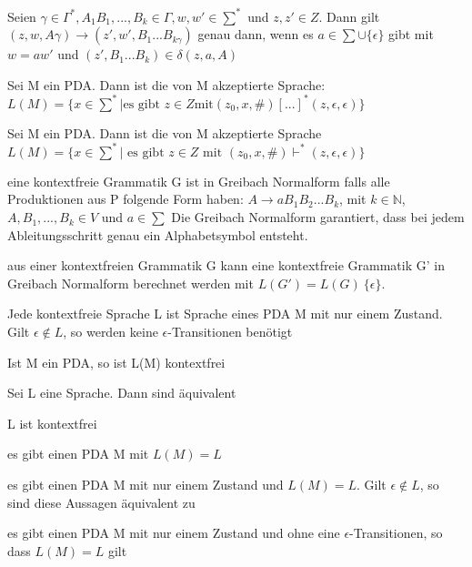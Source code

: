 \documentclass[avery5371, frame]{flashcards}
\begin{document}
\begin{flashcard}[Definition]{ Seien $\gamma\in\Gamma^*, A_1B_1,...,B_k\in\Gamma, w, w'\in\sum^*$ und $z,z'\in Z$. Dann gilt $(z,w,A\gamma)\rightarrow (z',w', B_1...B_{k\gamma})$ genau dann, wenn} es $a\in\sum \cup\{\epsilon\}$ gibt mit $w=aw'$ und $(z',B_1...B_k)\in\delta(z,a,A)$
\end{flashcard}

\begin{flashcard}[Definition]{ Sei M ein PDA. Dann ist die von M akzeptierte Sprache:} $L(M)=\{x\in\sum^* | \text{es gibt } z\in Z \text{mit} (z_0, x, \#) [...] ^*(z,\epsilon, \epsilon)\}$
\end{flashcard}

\begin{flashcard}[Definition]{ Sei M ein PDA. Dann ist die von M akzeptierte Sprache}
    $L(M)=\{x\in\sum^* | \text{ es gibt } z\in Z \text{ mit } (z_0,x,\#)\vdash^* (z,\epsilon,\epsilon)\}$
\end{flashcard}

\begin{flashcard}[Definition]{ eine kontextfreie Grammatik G ist in Greibach Normalform} falls alle Produktionen aus P folgende Form haben: $A\rightarrow aB_1B_2...B_k$, mit $k\in \mathbb{N}$, $A,B_1,...,B_k\in V$ und $a\in \sum$
    Die Greibach Normalform garantiert, dass bei jedem Ableitungsschritt genau ein Alphabetsymbol entsteht.
\end{flashcard}

\begin{flashcard}[Satz]{ aus einer kontextfreien Grammatik G kann eine kontextfreie Grammatik G' in Greibach Normalform berechnet werden mit}
    $L(G')=L(G)\ \{\epsilon\}$.

    Jede kontextfreie Sprache L ist Sprache eines PDA M mit nur einem Zustand. Gilt $\epsilon\not\in L$, so werden keine $\epsilon$-Transitionen benötigt

    Ist M ein PDA, so ist L(M) kontextfrei
\end{flashcard}

\begin{flashcard}[Satz]{ Sei L eine Sprache. Dann sind äquivalent}
    \begin{itemize*}
        \item L ist kontextfrei
        \item es gibt einen PDA M mit $L(M)=L$
        \item es gibt einen PDA M mit nur einem Zustand und $L(M)=L$. Gilt $\epsilon\not\in L$, so sind diese Aussagen äquivalent zu
        \item es gibt einen PDA M mit nur einem Zustand und ohne eine $\epsilon$-Transitionen, so dass $L(M)=L$ gilt
    \end{itemize*}
\end{flashcard}
\end{document}
